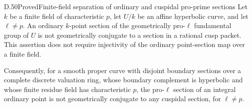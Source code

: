 \begin{statement}{D.50}{Proved}{Finite-field separation of ordinary and cuspidal pro-prime sections}
Let \(k\) be a finite field of characteristic \(p\),
let \(U/k\) be an affine hyperbolic curve, and let
\(\ell\ne p\). An ordinary \(k\)-point section of the
geometrically pro-\(\ell\) fundamental group of \(U\)
is not geometrically conjugate to a section in a
rational cusp packet. This assertion does not require
injectivity of the ordinary point-section map over
a finite field.

Consequently, for a smooth proper curve with disjoint
boundary sections over a complete discrete valuation ring,
whose boundary complement is hyperbolic and whose
finite residue field has characteristic \(p\),
the pro-\(\ell\) section of an integral ordinary
point is not geometrically conjugate to any
cuspidal section, for \(\ell\ne p\).
\end{statement}

